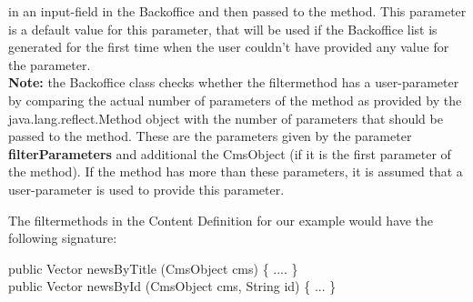 \begin{description}
in an input-field in the Backoffice and then passed to the method. This parameter is a default
value for this parameter, that will be used if the Backoffice list is generated for the first
time when the user couldn't have provided any value for the parameter.\\[1ex]
\textbf{Note:} the Backoffice class checks whether the filtermethod has a user-parameter by comparing
the actual number of parameters of the method as provided by the {\class java.lang.reflect.Method}
object with the number of parameters that should be passed to the method. These are the parameters
given by the parameter \textbf{filterParameters} and additional the {\class CmsObject} 
(if it is the first parameter of the method). If the method has more than these parameters, it is assumed
that a user-parameter is used to provide this parameter.
\end{description}

The filtermethods in the Content Definition for our example would have the following signature:
\begin{java}
\jtaba public Vector newsByTitle (CmsObject cms) \{ .... \}\\[1ex]
\jtaba public Vector newsById (CmsObject cms, String id) \{ ... \}\\
\end{java}






			



